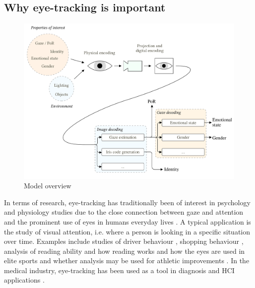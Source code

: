 \subsection{Why eye-tracking is important}
\begin{figure}
	\centering
	\includegraphics[width=1\textwidth]{figures/model/eye-tracking-model}
	\caption{Model overview}\label{fig:eye-tracking-model}
\end{figure}





In terms of research, \gls{eye-tracking} has traditionally been of interest in psychology and physiology studies due to the close connection between gaze and attention and the prominent use of eyes in humans everyday lives \parencite{duchowski2002breadth}. A typical application is the study of visual attention, i.e. where a person is looking in a specific situation over time. Examples include studies of driver behaviour \parencite{yoshizawa2017analysis}, shopping behaviour \parencite{bialkova2020desktop}, analysis of reading ability and how reading works \parencite{holsanova2006entry} and how the eyes are used in elite sports and whether analysis may be used for athletic improvements \parencite{biathlon}. In the medical industry, eye-tracking has been used as a tool in diagnosis and HCI applications \parencite{jayanthi2010automatic, holzman1974eye, galgani2009automatic}. 


